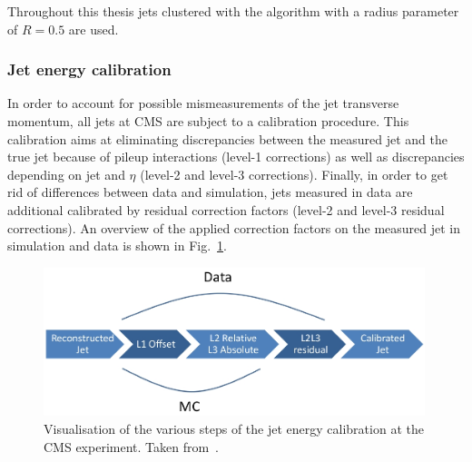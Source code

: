 Throughout this thesis jets clustered with the \antikt algorithm with a radius parameter of $R=0.5$ are used.

\subsubsection*{Jet energy calibration}
In order to account for possible mismeasurements of the jet transverse momentum, all jets at CMS are subject to a calibration procedure.
This calibration aims at eliminating discrepancies between the measured jet \pt and the true jet \pt because of pileup interactions (level-1 corrections) as well as discrepancies depending on jet \pt and $\eta$ (level-2 and level-3 corrections).
Finally, in order to get rid of differences between data and simulation, jets measured in data are additional calibrated by residual correction factors (level-2 and level-3 residual corrections).
An overview of the applied correction factors on the measured jet \pt in simulation and data is shown in Fig.~\ref{fig:JetEnergyCorrections}.
\begin{figure}[!bt]
  \centering
      \includegraphics[width=0.99\textwidth]{figures/experiment/ObjectReconstruction/JEC.jpg}
  \caption{Visualisation of the various steps of the jet energy calibration at the CMS experiment. Taken from~\cite{bib:Kristin_Thesis}.}  
  \label{fig:JetEnergyCorrections}
\end{figure}

